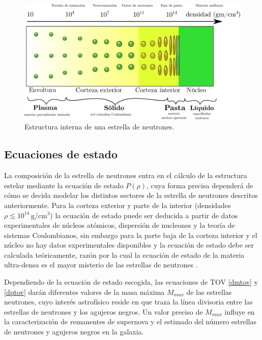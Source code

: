 \begin{figure}[H]
    \centering
    \includegraphics[width=400pt]{figures/Density.pdf}
    \caption[Estructura interna de una estrella de neutrones]{Estructura interna de una estrella de neutrones.\protect\footnotemark}
    \label{NSS}
\end{figure}

 

\subsection{Ecuaciones de estado}
La composición de la estrella de neutrones entra en el cálculo de la estructura estelar mediante la ecuación de estado $P(\rho)$, cuya forma precisa dependerá de cómo se decida modelar los distintos sectores de la estrella de neutrones descritos anteriormente. Para la corteza exterior y parte de la interior (densidades $\rho\lesssim 10^{14}\, \si{\gram \per\centi\metre^{3}}$) la ecuación de estado puede ser deducida a partir de datos experimentales de núcleos atómicos, dispersión de nucleones y la teoría de sistemas Coulombianos, sin embargo para la parte baja de la corteza interior y el núcleo no hay datos experimentales disponibles y la ecuación de estado debe ser calculada teóricamente, razón por la cual la ecuación de estado de la materia ultra-densa es el mayor misterio de las estrellas de neutrones . 

Dependiendo de la ecuación de estado escogida, las ecuaciones de TOV \eqref{dmtov} y \eqref{dptov} darán diferentes valores de la masa máxima $M_{max}$ de las estrellas neutrones, cuyo interés astrofísico reside en que traza la línea divisoria entre las estrellas de neutrones y los agujeros negros. Un valor preciso de $M_{max}$ influye en la caracterización de remanentes de supernova y el estimado del número estrellas de neutrones y agujeros negros en la galaxia.    


